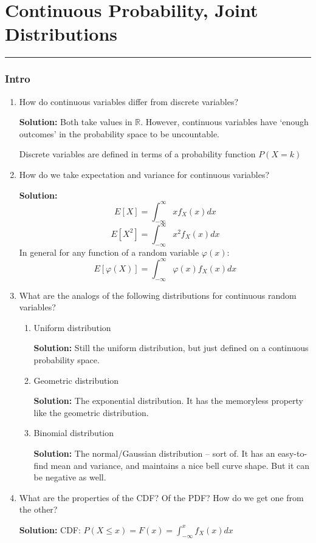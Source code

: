 \documentclass{article}
\newenvironment{solution}{

            \color{blue} \smallskip \textbf{Solution:}}{}
\begin{document}
    
    \part*{Continuous Probability, Joint Distributions}
    \vspace{-7pt}
    \hrule
    \vspace{7pt}
    \section{Intro}
    \begin{enumerate}
        \item How do continuous variables differ from discrete variables?
        \begin{solution}
            Both take values in $\mathbb{R}$. However, continuous variables have `enough outcomes' in the probability space to be uncountable.

            Discrete variables are defined in terms of a probability function $P(X = k)$
        \end{solution}
        \item How do we take expectation and variance for continuous variables?
        \begin{solution}
            \[
                E[X] = \int_{-\infty}^{\infty} x f_X(x) dx 
            \]
            \[
                E[X^2] = \int_{-\infty}^{\infty} x^2 f_X(x) dx
            \]
            In general for any function of a random variable $\varphi(x)$:
            \[  
                E[\varphi(X)] = \int_{-\infty}^{\infty} \varphi(x) f_X(x) dx
            \]
        \end{solution}
        \item What are the analogs of the following distributions for continuous random variables?
        \begin{enumerate}
            \item Uniform distribution
            \begin{solution}
                Still the uniform distribution, but just defined on a continuous probability space.
            \end{solution}
            \item Geometric distribution
            \begin{solution}
                The exponential distribution. It has the memoryless property like the geometric distribution.
            \end{solution}
            \item Binomial distribution
            \begin{solution}
                The normal/Gaussian distribution -- sort of. It has an easy-to-find mean and variance, and maintains a nice bell curve shape. But it can be negative as well.
            \end{solution}
        \end{enumerate}
        \item What are the properties of the CDF? Of the PDF? How do we get one from the other?
        \begin{solution}
            CDF: $P(X \leq x) = F(x) = \int_{-\infty}^x f_X(x) dx$


\end{solution}
\end{enumerate}
\end{document}
